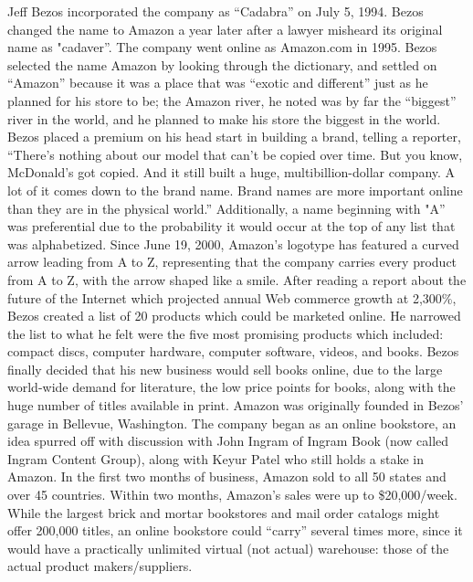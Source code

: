 Jeff Bezos incorporated the company as “Cadabra” on July 5, 1994. Bezos changed the name to Amazon a year later after a lawyer misheard its original name as "cadaver”. The company went online as Amazon.com in 1995.
\newline
Bezos selected the name Amazon by looking through the dictionary, and settled on “Amazon” because it was a place that was “exotic and different” just as he planned for his store to be; the Amazon river, he noted was by far the “biggest” river in the world, and he planned to make his store the biggest in the world. Bezos placed a premium on his head start in building a brand, telling a reporter, “There's nothing about our model that can't be copied over time. But you know, McDonald's got copied. And it still built a huge, multibillion-dollar company. A lot of it comes down to the brand name. Brand names are more important online than they are in the physical world.” Additionally, a name beginning with "A” was preferential due to the probability it would occur at the top of any list that was alphabetized.
\newline
Since June 19, 2000, Amazon's logotype has featured a curved arrow leading from A to Z, representing that the company carries every product from A to Z, with the arrow shaped like a smile.
\newline
After reading a report about the future of the Internet which projected annual Web commerce growth at 2,300\%, Bezos created a list of 20 products which could be marketed online. He narrowed the list to what he felt were the five most promising products which included: compact discs, computer hardware, computer software, videos, and books. Bezos finally decided that his new business would sell books online, due to the large world-wide demand for literature, the low price points for books, along with the huge number of titles available in print. Amazon was originally founded in Bezos' garage in Bellevue, Washington.
The company began as an online bookstore, an idea spurred off with discussion with John Ingram of Ingram Book (now called Ingram Content Group), along with Keyur Patel who still holds a stake in Amazon. In the first two months of business, Amazon sold to all 50 states and over 45 countries. Within two months, Amazon's sales were up to \$20,000/week. While the largest brick and mortar bookstores and mail order catalogs might offer 200,000 titles, an online bookstore could “carry” several times more, since it would have a practically unlimited virtual (not actual) warehouse: those of the actual product makers/suppliers.
